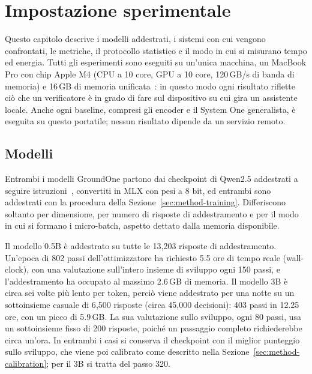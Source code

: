 \chapter{Impostazione sperimentale}
\label{sec:setup}


Questo capitolo descrive i modelli addestrati, i sistemi con cui vengono confrontati, le metriche, il protocollo
statistico e il modo in cui si misurano tempo ed energia. Tutti gli esperimenti sono eseguiti su un'unica macchina, un
MacBook Pro con chip Apple M4 (CPU a 10 core, GPU a 10 core, 120\,GB/s di banda di memoria) e 16\,GB di memoria
unificata~\cite{apple2024m4specs}: in questo modo ogni risultato riflette ciò che un verificatore è in grado di fare sul
dispositivo su cui gira un assistente locale. Anche ogni baseline, compresi gli encoder e il System One generalista, è
eseguita su questo portatile; nessun risultato dipende da un servizio remoto.

\section{Modelli}
\label{sec:setup-models}

Entrambi i modelli GroundOne partono dai checkpoint di Qwen2.5 addestrati a seguire istruzioni~\cite{qwen2024qwen25},
convertiti in MLX con pesi a 8 bit, ed entrambi sono addestrati con la procedura della
Sezione~\ref{sec:method-training}. Differiscono soltanto per dimensione, per numero di risposte di addestramento e per il
modo in cui si formano i micro-batch, aspetto dettato dalla memoria disponibile.

Il modello 0.5B è addestrato su tutte le 13{,}203 risposte di addestramento. Un'epoca di 802 passi dell'ottimizzatore ha
richiesto 5.5 ore di tempo reale (wall-clock), con una valutazione sull'intero insieme di sviluppo ogni 150 passi, e
l'addestramento ha occupato al massimo 2.6\,GB di memoria. Il modello 3B è circa sei volte più lento per token, perciò
viene addestrato per una notte su un sottoinsieme casuale di 6{,}500 risposte (circa 45{,}000 decisioni): 403 passi in
12.25 ore, con un picco di 5.9\,GB. La sua valutazione sullo sviluppo, ogni 80 passi, usa un sottoinsieme fisso di 200
risposte, poiché un passaggio completo richiederebbe circa un'ora. In entrambi i casi si conserva il checkpoint con il
miglior punteggio sullo sviluppo, che viene poi calibrato come descritto nella Sezione~\ref{sec:method-calibration}; per
il 3B si tratta del passo 320.


